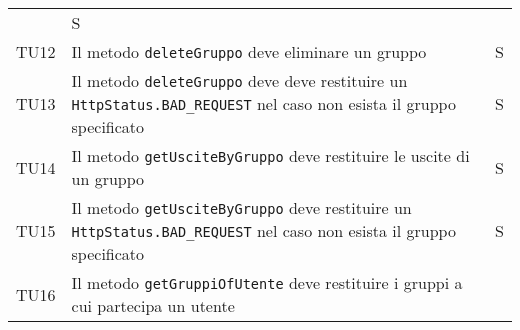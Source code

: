 \begin{center}
{\begin{longtable}{
      |>{\centering\arraybackslash}p{48pt}
      |>{\centering\arraybackslash}p{308pt}
      |>{\centering\arraybackslash}p{27pt}|}
                  & S                                              \\
      TU12
                  & Il metodo \texttt{deleteGruppo}
      deve eliminare un gruppo
                  & S                                              \\
      TU13
                  & Il metodo \texttt{deleteGruppo}
      deve deve restituire un \texttt{ HttpStatus.BAD\_REQUEST} nel caso non
      esista
      il gruppo specificato
                  & S                                              \\
      TU14
                  & Il metodo
      \texttt{getUsciteByGruppo} deve restituire le uscite di un gruppo
                  & S                                              \\
      TU15
                  & Il metodo
      \texttt{getUsciteByGruppo} deve restituire un \texttt{
        HttpStatus.BAD\_REQUEST}
      nel caso non esista il gruppo specificato
                  & S                                              \\
      TU16
                  & Il metodo
      \texttt{getGruppiOfUtente} deve restituire i gruppi a cui partecipa un
      utente


\end{longtable}}
\end{center}
